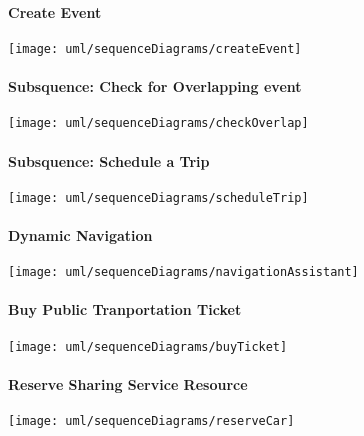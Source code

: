 \paragraph{Create Event}
	\texttt{[image: uml/sequenceDiagrams/createEvent]}
	\vfill
	
\paragraph{Subsquence: Check for Overlapping event}
	\texttt{[image: uml/sequenceDiagrams/checkOverlap]}
	\vfill
		
\paragraph{Subsquence: Schedule a Trip}	
	\texttt{[image: uml/sequenceDiagrams/scheduleTrip]}
	\vfill
	
\paragraph{Dynamic Navigation}	
	\texttt{[image: uml/sequenceDiagrams/navigationAssistant]}
	\vfill

\paragraph{Buy Public Tranportation Ticket}
	\texttt{[image: uml/sequenceDiagrams/buyTicket]}
	\vfill

\paragraph{Reserve Sharing Service Resource}
	\texttt{[image: uml/sequenceDiagrams/reserveCar]}
	\vfill
